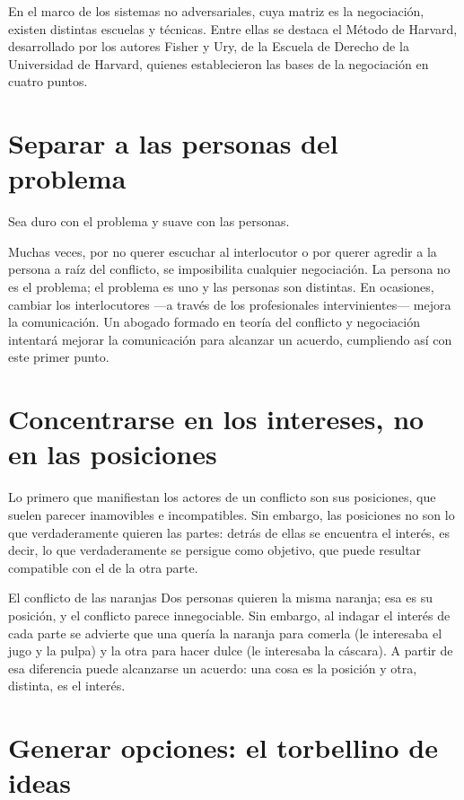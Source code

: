 \documentclass[12pt,oneside]{book}
\begin{document}
En el marco de los sistemas no adversariales, cuya matriz es la negociación, existen distintas escuelas y técnicas. Entre ellas se destaca el Método de Harvard, desarrollado por los autores Fisher y Ury, de la Escuela de Derecho de la Universidad de Harvard, quienes establecieron las bases de la negociación en cuatro puntos.

\section{Separar a las personas del problema}

\begin{important}
Sea duro con el problema y suave con las personas.
\end{important}

Muchas veces, por no querer escuchar al interlocutor o por querer agredir a la persona a raíz del conflicto, se imposibilita cualquier negociación. La persona no es el problema; el problema es uno y las personas son distintas. En ocasiones, cambiar los interlocutores ---a través de los profesionales intervinientes--- mejora la comunicación. Un abogado formado en teoría del conflicto y negociación intentará mejorar la comunicación para alcanzar un acuerdo, cumpliendo así con este primer punto.

\section{Concentrarse en los intereses, no en las posiciones}

Lo primero que manifiestan los actores de un conflicto son sus posiciones, que suelen parecer inamovibles e incompatibles. Sin embargo, las posiciones no son lo que verdaderamente quieren las partes: detrás de ellas se encuentra el interés, es decir, lo que verdaderamente se persigue como objetivo, que puede resultar compatible con el de la otra parte.

\begin{example}{El conflicto de las naranjas}
Dos personas quieren la misma naranja; esa es su posición, y el conflicto parece innegociable. Sin embargo, al indagar el interés de cada parte se advierte que una quería la naranja para comerla (le interesaba el jugo y la pulpa) y la otra para hacer dulce (le interesaba la cáscara). A partir de esa diferencia puede alcanzarse un acuerdo: una cosa es la posición y otra, distinta, es el interés.
\end{example}

\section{Generar opciones: el torbellino de ideas}
\end{document}
